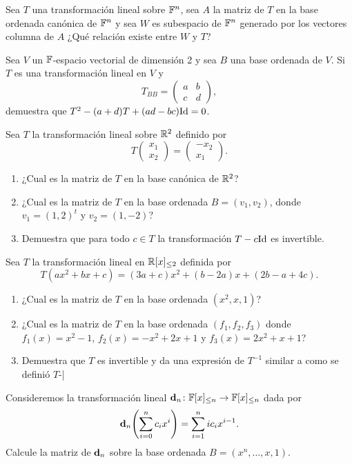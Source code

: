 \begin{exerciselist}
  \item Sea $T$ una transformación lineal sobre $\mathbb{F}^n$, sea $A$ la matriz de $T$ en la base ordenada canónica de $\mathbb{F}^n$ y sea $W$ es subespacio de $\mathbb{F}^n$ generado por los vectores columna de $A$ ¿Qué relación existe entre $W$ y $T$?
  
  \item Sea $V$ un $\mathbb{F}$-espacio vectorial de dimensión 2 y sea $B$ una base ordenada de $V$. Si $T$ es una transformación lineal en $V$ y 
    \[ T_{BB} = \begin{pmatrix}
      a & b \\ c & d
    \end{pmatrix}, \]
    demuestra que $T^2 - (a+d)T + (ad-bc)\mathrm{Id} = 0$.

  \item Sea $T$ la transformación lineal sobre $\mathbb{R}^2$ definido por
    \[ T\begin{pmatrix} x_1 \\ x_2 \end{pmatrix} = \begin{pmatrix} -x_2 \\ x_1 \end{pmatrix}. \]
    \begin{enumerate}
      \item ¿Cual es la matriz de $T$ en la base canónica de $\mathbb{R}^2$?
      \item ¿Cual es la matriz de $T$ en la base ordenada $B = (v_1, v_2)$, donde $v_1 = (1,2)^t$ y $v_2 = (1, -2)$?
      \item Demuestra que para todo $c \in T$ la transformación $T - c\mathrm{Id}$ es invertible.
    \end{enumerate}
    
  \item Sea $T$ la transformación lineal en $\mathbb{R}[x]_{\leq 2}$ definida por
    \[ T(ax^2+bx+c) = (3a+c)x^2 + (b-2a)x + (2b-a+4c). \]
    \begin{enumerate}
      \item ¿Cual es la matriz de $T$ en la base ordenada $(x^2, x, 1)$?
      \item ¿Cual es la matriz de $T$ en la base ordenada $(f_1, f_2, f_3)$ donde $f_1(x) = x^2-1$, $f_2(x) = -x^2+2x+1$ y $f_3(x) = 2x^2 +x +1$?
      \item Demuestra que $T$ es invertible y da una expresión de $T^{-1}$ similar a como se definió $T$-|
    \end{enumerate}

  \item Consideremos la transformación lineal $\mathbf{d}_n \colon \mathbb{F}[x]_{\leq n} \to \mathbb{F}[x]_{\leq n}$ dada por
    \[ \bec d_n \paren{\sum_{i=0}^n c_ix^i} = \sum_{i=1}^n ic_ix^{i-1}. \]
    Calcule la matriz de $\mathbf{d}_n$ sobre la base ordenada $B = (x^n, \ldots, x, 1)$.
\end{exerciselist}